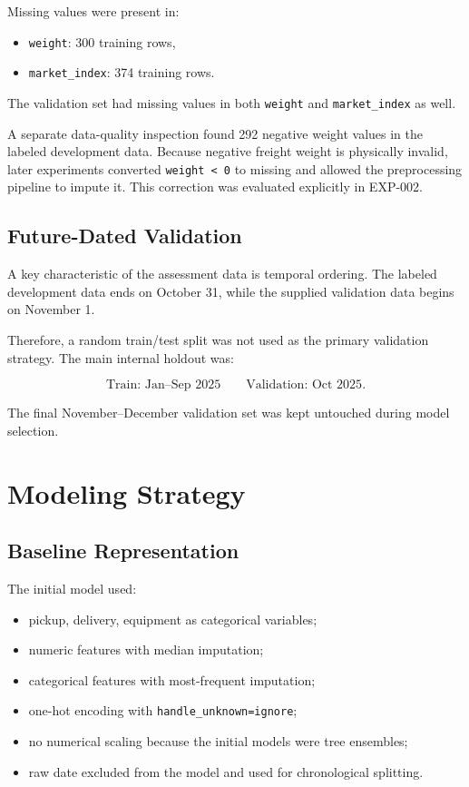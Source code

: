 \documentclass[11pt,a4paper]{article}
\begin{document}
Missing values were present in:
\begin{itemize}
    \item \texttt{weight}: 300 training rows,
    \item \texttt{market\_index}: 374 training rows.
\end{itemize}

The validation set had missing values in both \texttt{weight} and \texttt{market\_index} as well.

A separate data-quality inspection found 292 negative weight values in the labeled development data. Because negative freight weight is physically invalid, later experiments converted \texttt{weight < 0} to missing and allowed the preprocessing pipeline to impute it. This correction was evaluated explicitly in EXP-002.

\subsection{Future-Dated Validation}

A key characteristic of the assessment data is temporal ordering. The labeled development data ends on October 31, while the supplied validation data begins on November 1.

Therefore, a random train/test split was not used as the primary validation strategy. The main internal holdout was:

\[
\text{Train: Jan--Sep 2025}
\qquad
\text{Validation: Oct 2025}.
\]

The final November--December validation set was kept untouched during model selection.

\section{Modeling Strategy}

\subsection{Baseline Representation}

The initial model used:
\begin{itemize}
    \item pickup, delivery, equipment as categorical variables;
    \item numeric features with median imputation;
    \item categorical features with most-frequent imputation;
    \item one-hot encoding with \texttt{handle\_unknown=ignore};
    \item no numerical scaling because the initial models were tree ensembles;
    \item raw date excluded from the model and used for chronological splitting.
\end{itemize}
\end{document}
